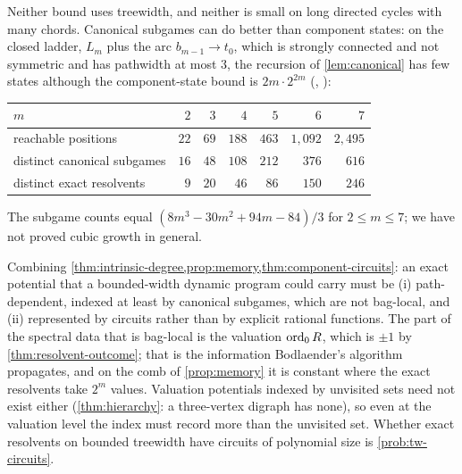Neither bound uses treewidth, and neither is small on long directed cycles with many chords. Canonical subgames can do better than component states: on the closed ladder, $L_m$ plus the arc $b_{m-1}\to t_0$, which is strongly connected and not symmetric and has pathwidth at most $3$, the recursion of \cref{lem:canonical} has few states although the component-state bound is $2m\cdot2^{2m}$ \textup{(}, \textup{)}:
\begin{center}\small
\begin{tabular}{@{}lrrrrrr@{}}
\toprule
$m$ & $2$ & $3$ & $4$ & $5$ & $6$ & $7$\\ \midrule
reachable positions & $22$ & $69$ & $188$ & $463$ & $1{,}092$ & $2{,}495$\\
distinct canonical subgames & $16$ & $48$ & $108$ & $212$ & $376$ & $616$\\
distinct exact resolvents & $9$ & $20$ & $46$ & $86$ & $150$ & $246$\\
\bottomrule
\end{tabular}
\end{center}
The subgame counts equal $(8m^{3}-30m^{2}+94m-84)/3$ for $2\le m\le7$; we have not proved cubic growth in general.

\begin{remark}\label{rem:bodlaender}
Combining \cref{thm:intrinsic-degree,prop:memory,thm:component-circuits}: an exact potential that a bounded-width dynamic program could carry must be (i) path-dependent, indexed at least by canonical subgames, which are not bag-local, and (ii) represented by circuits rather than by explicit rational functions. The part of the spectral data that is bag-local is the valuation $\operatorname{ord}_0R$, which is $\pm1$ by \cref{thm:resolvent-outcome}; that is the information Bodlaender's algorithm propagates, and on the comb of \cref{prop:memory} it is constant where the exact resolvents take $2^{m}$ values. Valuation potentials indexed by unvisited sets need not exist either (\cref{thm:hierarchy}: a three-vertex digraph has none), so even at the valuation level the index must record more than the unvisited set. Whether exact resolvents on bounded treewidth have circuits of polynomial size is \cref{prob:tw-circuits}.
\end{remark}
